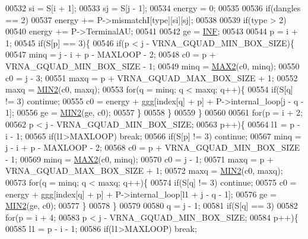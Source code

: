 \begin{DoxyCode}
00532   si      = S[i + 1];
00533   sj      = S[j - 1];
00534   energy  = 0;
00535 
00536   \textcolor{keywordflow}{if}(dangles == 2)
00537     energy += P->mismatchI[type][si][sj];
00538 
00539   \textcolor{keywordflow}{if}(type > 2)
00540     energy += P->TerminalAU;
00541 
00542   ge = \hyperlink{energy__const_8h_a12c2040f25d8e3a7b9e1c2024c618cb6}{INF};
00543 
00544   p = i + 1;
00545   \textcolor{keywordflow}{if}(S[p] == 3)\{
00546     \textcolor{keywordflow}{if}(p < j - VRNA\_GQUAD\_MIN\_BOX\_SIZE)\{
00547       minq  = j - i + p - MAXLOOP - 2;
00548       c0    = p + VRNA\_GQUAD\_MIN\_BOX\_SIZE - 1;
00549       minq  = \hyperlink{group__utils_gadd91367918fadbc8d585940d6206d6d2}{MAX2}(c0, minq);
00550       c0    = j - 3;
00551       maxq  = p + VRNA\_GQUAD\_MAX\_BOX\_SIZE + 1;
00552       maxq  = \hyperlink{group__utils_ga2dd4a927a7f937f43a90c144d79107d8}{MIN2}(c0, maxq);
00553       \textcolor{keywordflow}{for}(q = minq; q < maxq; q++)\{
00554         \textcolor{keywordflow}{if}(S[q] != 3) \textcolor{keywordflow}{continue};
00555         c0  = energy + ggg[index[q] + p] + P->internal\_loop[j - q - 1];
00556         ge  = \hyperlink{group__utils_ga2dd4a927a7f937f43a90c144d79107d8}{MIN2}(ge, c0);
00557       \}
00558     \}
00559   \}
00560 
00561   \textcolor{keywordflow}{for}(p = i + 2;
00562       p < j - VRNA\_GQUAD\_MIN\_BOX\_SIZE;
00563       p++)\{
00564     l1    = p - i - 1;
00565     \textcolor{keywordflow}{if}(l1>MAXLOOP) \textcolor{keywordflow}{break};
00566     \textcolor{keywordflow}{if}(S[p] != 3) \textcolor{keywordflow}{continue};
00567     minq  = j - i + p - MAXLOOP - 2;
00568     c0    = p + VRNA\_GQUAD\_MIN\_BOX\_SIZE - 1;
00569     minq  = \hyperlink{group__utils_gadd91367918fadbc8d585940d6206d6d2}{MAX2}(c0, minq);
00570     c0    = j - 1;
00571     maxq  = p + VRNA\_GQUAD\_MAX\_BOX\_SIZE + 1;
00572     maxq  = \hyperlink{group__utils_ga2dd4a927a7f937f43a90c144d79107d8}{MIN2}(c0, maxq);
00573     \textcolor{keywordflow}{for}(q = minq; q < maxq; q++)\{
00574       \textcolor{keywordflow}{if}(S[q] != 3) \textcolor{keywordflow}{continue};
00575       c0  = energy + ggg[index[q] + p] + P->internal\_loop[l1 + j - q - 1];
00576       ge   = \hyperlink{group__utils_ga2dd4a927a7f937f43a90c144d79107d8}{MIN2}(ge, c0);
00577     \}
00578   \}
00579 
00580   q = j - 1;
00581   \textcolor{keywordflow}{if}(S[q] == 3)
00582     \textcolor{keywordflow}{for}(p = i + 4;
00583         p < j - VRNA\_GQUAD\_MIN\_BOX\_SIZE;
00584         p++)\{
00585       l1    = p - i - 1;
00586       \textcolor{keywordflow}{if}(l1>MAXLOOP) \textcolor{keywordflow}{break};

\end{DoxyCode}
